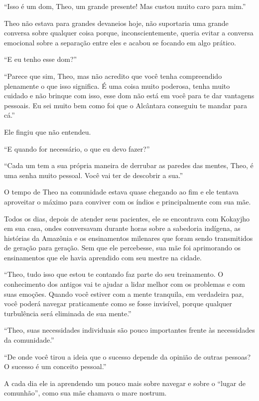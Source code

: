 ``Isso é um dom, Theo, um grande presente! Mas custou muito caro para
mim.''

Theo não estava para grandes devaneios hoje, não suportaria uma grande
conversa sobre qualquer coisa porque, inconscientemente, queria evitar a
conversa emocional sobre a separação entre eles e acabou se focando em
algo prático.

``E eu tenho esse dom?''

``Parece que sim, Theo, mas não acredito que você tenha compreendido
plenamente o que isso significa. É uma coisa muito poderosa, tenha muito
cuidado e não brinque com isso, esse dom não está em você para te dar
vantagens pessoais. Eu sei muito bem como foi que o Alcântara conseguiu
te mandar para cá.''

Ele fingiu que não entendeu.

``E quando for necessário, o que eu devo fazer?''

``Cada um tem a sua própria maneira de derrubar as paredes das mentes,
Theo, é uma senha muito pessoal. Você vai ter de descobrir a sua.''

\asterisc


O tempo de Theo na comunidade estava quase chegando ao fim e ele tentava
aproveitar o máximo para conviver com os índios e principalmente com sua
mãe.

Todos os dias, depois de atender seus pacientes, ele se encontrava com
Kokayjho em sua casa, ondes conversavam durante horas sobre a sabedoria
indígena, as histórias da Amazônia e os ensinamentos milenares que foram
sendo transmitidos de geração para geração. Sem que ele percebesse, sua
mãe foi aprimorando os ensinamentos que ele havia aprendido com seu
mestre na cidade.

``Theo, tudo isso que estou te contando faz parte do seu treinamento. O
conhecimento dos antigos vai te ajudar a lidar melhor com os problemas e
com suas emoções. Quando você estiver com a mente tranquila, em
verdadeira paz, você poderá navegar praticamente como se fosse
invisível, porque qualquer turbulência será eliminada de sua mente.''

``Theo, suas necessidades individuais são pouco importantes frente às
necessidades da comunidade.''

``De onde você tirou a ideia que o sucesso depende da opinião de outras
pessoas? O sucesso é um conceito pessoal.''

A cada dia ele ia aprendendo um pouco mais sobre navegar e sobre o
``lugar de comunhão'', como sua mãe chamava o mare nostrum.

